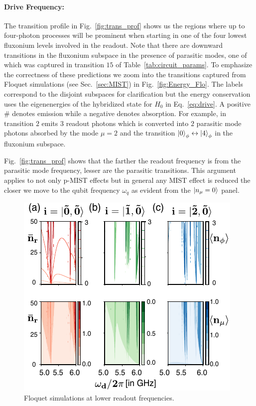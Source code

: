 \documentclass[prx,showpacs,notitlepage,twocolumn,superscriptaddress,nofootinbib,preprintnumbers,floatfix]{revtex4-2}
\begin{document}
\paragraph{Drive Frequency:} 
The transition profile in Fig.~\ref{fig:trans_prof} shows us the regions where up to four-photon processes will be prominent when starting in one of the four lowest fluxonium levels involved in the readout. Note that there are downward transitions in the fluxonium subspace in the presence of parasitic modes, one of which was captured in transition $15$ of Table~\ref{tab:circuit_params}. To emphasize the correctness of these predictions we zoom into the transitions captured from Floquet simulations (see Sec.~\ref{sec:MIST}) in Fig.~\ref{fig:Energy_Flo}. The labels correspond to the disjoint subspaces for clarification but the energy conservation uses the eigenenergies of the hybridized state for $H_{0}$ in Eq.~\ref{eq:drive}. A positive $\#$ denotes emission while a negative denotes absorption. For example, in transition $2$ emits $3$ readout photons which is converted into $2$ parasitic mode photons absorbed by the mode $\mu=2$ and the transition $\ket{0}_\phi\leftrightarrow \ket{4}_\phi$ in the fluxonium subspace. 

Fig.~\ref{fig:trans_prof} shows that the farther the readout frequency is from the parasitic mode frequency, lesser are the parasitic transitions. This argument applies to not only p-MIST effects but in general any MIST effect is reduced the closer we move to the qubit frequency $\omega_q$ as evident from the $\ket{n_\mu=0}$ panel. 

\begin{figure}
    \centering
    \includegraphics[width=\linewidth]{Fluxonium_Readout_manuscript/Figures/Floquet_low.pdf}
    \caption{Floquet simulations at lower readout frequencies.}
    \label{fig:Flo_low}
\end{figure}
\end{document}
